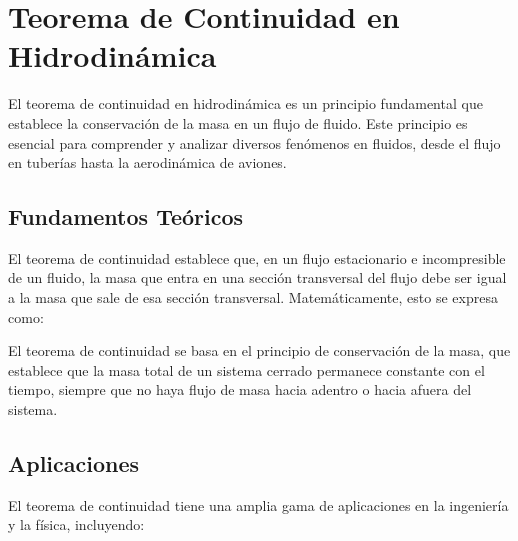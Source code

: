 \documentclass[../main]{subfiles}
\begin{document}
\section{Teorema de Continuidad en Hidrodinámica}

El teorema de continuidad en hidrodinámica es un principio fundamental que establece la conservación de la masa en un flujo de fluido. Este principio es esencial para comprender y analizar diversos fenómenos en fluidos, desde el flujo en tuberías hasta la aerodinámica de aviones.

\subsection{Fundamentos Teóricos}

El teorema de continuidad establece que, en un flujo estacionario e incompresible de un fluido, la masa que entra en una sección transversal del flujo debe ser igual a la masa que sale de esa sección transversal. Matemáticamente, esto se expresa como:


El teorema de continuidad se basa en el principio de conservación de la masa, que establece que la masa total de un sistema cerrado permanece constante con el tiempo, siempre que no haya flujo de masa hacia adentro o hacia afuera del sistema.

\subsection{Aplicaciones}

El teorema de continuidad tiene una amplia gama de aplicaciones en la ingeniería y la física, incluyendo:
\end{document}
